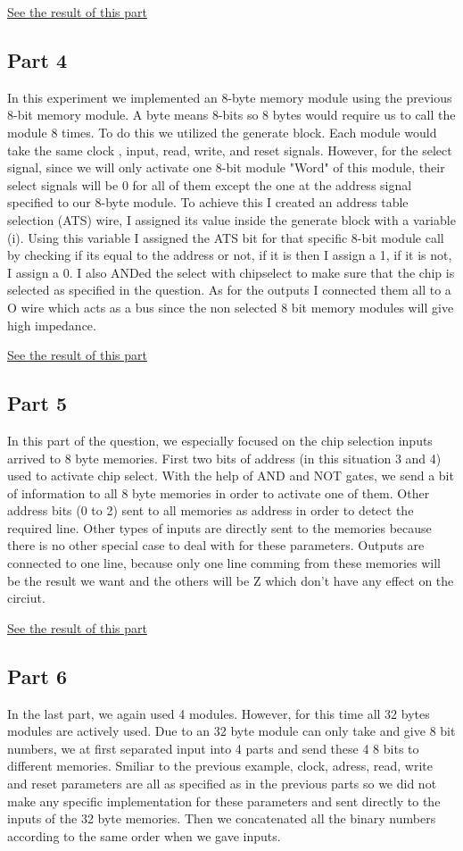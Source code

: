 \documentclass[pdftex,12pt,a4paper]{article}
\begin{document}
\hyperlink{hype3}{See the result of this part}

\subsection{Part 4}
In this experiment we implemented an 8-byte memory module using the previous 8-bit memory module. A byte means 8-bits so 8 bytes would require us to call the module 8 times. To do this we utilized the generate block. Each module would take the same clock , input, read, write, and reset signals. However, for the select signal, since we will only activate one 8-bit module "Word" of this module, their select signals will be 0 for all of them except the one at the address signal specified to our 8-byte module. To achieve this I created an address table selection (ATS) wire, I assigned its value inside the generate block with a variable (i). Using this variable I assigned the ATS bit for that specific 8-bit module call by checking if its equal to the address or not, if it is then I assign a 1, if it is not, I assign a 0. I also ANDed the select with chipselect to make sure that the chip is selected as specified in the question. As for the outputs I connected them all to a O wire which acts as a bus since the non selected 8 bit memory modules will give high impedance.

\hyperlink{hype4}{See the result of this part}

\subsection{Part 5}
In this part of the question, we especially focused on the chip selection inputs arrived to 8 byte memories.  First two bits of address (in this situation 3 and 4) used to activate chip select. With the help of AND and NOT gates, we send a bit of information to all 8 byte memories in order to activate one of them. Other address bits (0 to 2) sent to all memories as address in order to detect the required line. Other types of inputs are directly sent to the memories because there is no other special case to deal with for these parameters. Outputs are connected to one line, because only one line comming from these memories will be the result we want and the others will be Z which don't have any effect on the circiut.

\hyperlink{hype5}{See the result of this part}

\subsection{Part 6}
In the last part, we again used 4 modules. However, for this time all 32 bytes modules are actively used. Due to an 32 byte module can only take and give 8 bit numbers, we at first separated input into 4 parts and send these 4 8 bits to different memories. Smiliar to the previous example, clock, adress, read, write and reset parameters are all as specified as in the previous parts so we did not make any specific implementation for these parameters and sent directly to the inputs of the 32 byte memories. Then we concatenated all the binary numbers according to the same order when we gave inputs.
\end{document}
